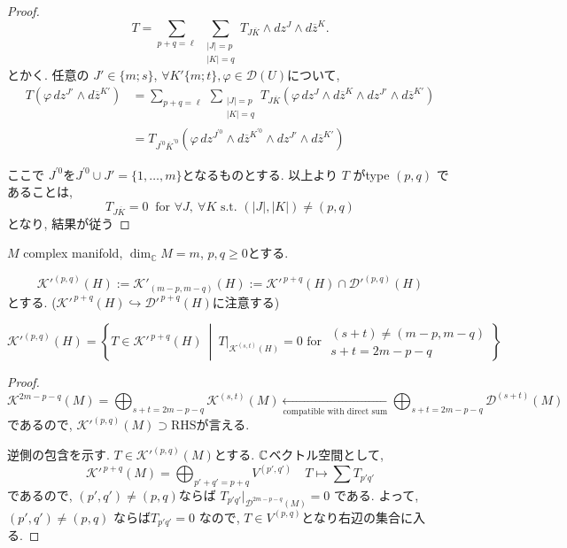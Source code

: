 \begin{proof}
\[
T=\sum_{p+q=\ell}\ \sum_{\substack{|J|=p\\|K|=q}} T_{J\overline{K}}\wedge dz^{J}\wedge d\overline{z}^{K}.
\]
とかく. 
任意の \(J'\in \{m;s\}\), \(\forall K'\{m;t\},  \varphi\in \mathcal{D}(U)\)について, 
\begin{align*}
T(\varphi\,dz^{J'}\wedge d\overline{z}^{K'})
&=
\sum_{p+q=\ell}\ \sum_{\substack{|J|=p\\|K|=q}}
T_{J\overline{K}}(\varphi\,dz^{J}\wedge d\overline{z}^{K}\wedge dz^{J'}\wedge d\overline{z}^{K'})\\
&=
T_{J^{'0}\overline{K}^{'0}}(\varphi\,dz^{J^{'0}}\wedge d\overline{z}^{K^{'0}}\wedge dz^{J'}\wedge d\overline{z}^{K'})
\end{align*}

ここで
\(J^{'0}\)を\(J^{'0}\cup J'=\{1,\dots,m\}\)となるものとする. 
以上より
\(T\) がtype \((p,q)\) であることは, 
\[
T_{J\overline{K}}=0 \ \text{ for } \forall J,\ \forall K
\text{ s.t. } (|J|,|K|)\neq (p,q)
\]
となり, 結果が従う

\end{proof}


\begin{tcolorbox}[mybox]
\begin{defn}
\label{defn-M-4.11}
\(M\) complex manifold, \(\dim_{\mathbb{C}}M=m\), \(p,q\geq 0\)とする. 

\[
\mathcal{K}'^{(p,q)}(H):=\mathcal{K}'_{(m-p,m-q)}(H):=\mathcal{K}'^{\,p+q}(H)\cap \mathcal{D}'^{(p,q)}(H)
\]
とする. ($\mathcal{K}'^{\,p+q}(H)\hookrightarrow \mathcal{D}'^{\,p+q}(H)$に注意する)
\end{defn}
\end{tcolorbox}

\begin{rem}
\label{rem-M-4.12}
\[
\mathcal{K}'^{(p,q)}(H)=\left\{T\in \mathcal{K}'^{\,p+q}(H)\ \middle|\ T|_{\mathcal{K}^{(s,t)}(H)}=0 \text{ for } 
\begin{array}{l}
(s+t)\neq (m-p,m-q) \\
s+t=2m-p-q
\end{array}
\right\}
\]
\begin{proof}
\[
\mathcal{K}^{2m-p-q}(M)=\bigoplus_{s+t=2m-p-q}\mathcal{K}^{(s,t)}(M)
\underset{\text{compatible with direct sum}}{\longleftarrow} \bigoplus_{s+t=2m-p-q}\mathcal{D}^{(s+t)}(M)
\]
であるので, 
\(
\mathcal{K}'^{(p,q)}(M)\supset \mathrm{RHS} \)が言える. 

逆側の包含を示す. 
\(T\in \mathcal{K}'^{(p,q)}(M)\)とする.
$\mathbb{C}$ベクトル空間として,  
$$
\mathcal{K}'^{\,p+q}(M)=\bigoplus_{p'+q'=p+q} V^{(p',q')}
\quad
T \longmapsto \sum T_{p'q'}
$$
であるので, $ (p',q')\neq (p,q)$ならば
$T_{p'q'}\big|_{\mathcal{D}^{2m-p-q}(M)}=0$
である. 
よって, $(p',q')\neq (p,q)$
ならば$T_{p'q'}=0$
なので, $T \in  V^{(p,q)}$となり右辺の集合に入る. 
\end{proof}
\end{rem}



